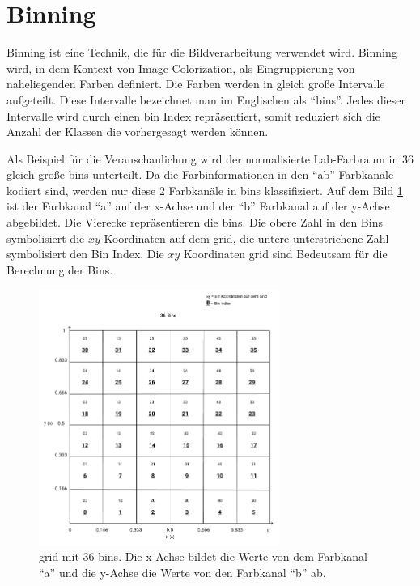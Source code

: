 \section{Binning}\label{section:binning}
Binning ist eine Technik, die für die Bildverarbeitung verwendet wird. Binning wird, in dem Kontext von Image Colorization, als Eingruppierung 
von naheliegenden Farben definiert. Die Farben werden in gleich große Intervalle aufgeteilt. Diese Intervalle bezeichnet man im Englischen als
``\gls{bin}s''. Jedes dieser Intervalle wird durch einen \gls{bin} Index repräsentiert, somit reduziert sich die Anzahl der Klassen die vorhergesagt werden
können.

Als Beispiel für die Veranschaulichung wird der normalisierte Lab-Farbraum in 36 gleich große \gls{bin}s unterteilt. Da die Farbinformationen 
in den ``ab'' Farbkanäle kodiert sind, werden nur diese 2 Farbkanäle in \gls{bin}s klassifiziert. Auf dem Bild \ref{image:bins} ist der Farbkanal 
``a'' auf der x-Achse und der ``b'' Farbkanal auf der y-Achse abgebildet. Die Vierecke repräsentieren die \gls{bin}s. Die obere Zahl in den Bins 
symbolisiert die $xy$ Koordinaten auf dem \gls{grid}, die untere unterstrichene Zahl symbolisiert den Bin Index. 
Die $xy$ Koordinaten \gls{grid} sind Bedeutsam für die Berechnung der Bins.

\begin{figure}[H]
  \centering
  \includegraphics[width=0.7\textwidth]{resources/bins/bins.jpg}
  \caption{
  \gls{grid} mit 36 bins. Die x-Achse bildet die Werte von dem Farbkanal ``a'' und die y-Achse die Werte von den Farbkanal ``b'' ab.
  }
  \label{image:bins}
\end{figure}

